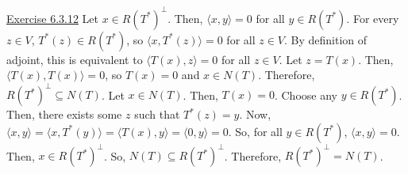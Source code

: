 \documentclass{exam}
\begin{document}
\underline{Exercise 6.3.12}
\newline
\newline
Let $x\in R(T^*)^\perp$. Then, $\langle x,y\rangle=0$ for all $y\in R(T^*)$. For every $z\in V$, $T^*(z)\in R(T^*)$, so $\langle x,T^*(z)\rangle=0$ for all $z\in V$. By definition of adjoint, this is equivalent to $\langle T(x),z\rangle=0$ for all $z\in V$. Let $z=T(x)$. Then, $\langle T(x),T(x)\rangle=0$, so $T(x)=0$ and $x\in N(T)$. Therefore, $R(T^*)^\perp\subseteq N(T)$.
\newline
\newline
Let $x\in N(T)$. Then, $T(x)=0$. Choose any $y\in R(T^*)$. Then, there exists some $z$ such that $T^*(z)=y$. Now, $\langle x,y\rangle=\langle x,T^*(y)\rangle=\langle T(x),y\rangle=\langle0,y\rangle=0$. So, for all $y\in R(T^*)$, $\langle x,y\rangle=0$. Then, $x\in R(T^*)^\perp$. So, $N(T)\subseteq R(T^*)^\perp$. Therefore, $R(T^*)^\perp=N(T)$.
\newline
\end{document}
